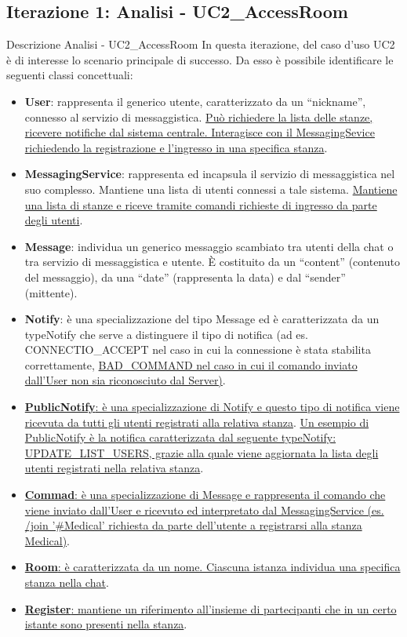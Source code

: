 \documentclass[t]{beamer} %
\let\olditem=\item%
\renewcommand{\item}{\olditem \justifying}%
\begin{document}
\subsection{Iterazione 1: Analisi - UC2\_AccessRoom}
\begin{frame} [allowframebreaks] {Descrizione Analisi - UC2\_AccessRoom}
  In questa iterazione, del caso d’uso UC2 è di interesse lo scenario principale di successo.  Da esso è possibile identificare le seguenti classi concettuali: 
  \begin{itemize}
    \item \textbf{User}: rappresenta il generico utente, caratterizzato da un ``nickname'', connesso al servizio di messaggistica. \underline{Può richiedere la lista 
     delle stanze, ricevere notifiche dal sistema centrale. Interagisce con il MessagingSevice richiedendo la registrazione e l'ingresso in una specifica stanza}.
    \item \textbf{MessagingService}: rappresenta ed incapsula il servizio di messaggistica nel suo complesso. Mantiene una lista di utenti connessi a tale sistema. 
          \underline{Mantiene una lista di stanze e riceve tramite comandi richieste di ingresso da parte degli utenti}.
    \item \textbf{Message}: individua un generico messaggio scambiato tra utenti della chat o tra servizio di messaggistica e utente. È costituito da un ``content'' 
          (contenuto del messaggio), da una ``date'' (rappresenta la data) e dal ``sender'' (mittente).
    \item \textbf{Notify}: è una specializzazione del tipo Message ed è caratterizzata da un typeNotify che serve a distinguere il tipo di notifica (ad es. 
          CONNECTIO\_ACCEPT nel caso in cui la connessione è stata stabilita correttamente, \underline{BAD\_COMMAND nel caso in cui il comando inviato dall'User non 
          sia riconosciuto dal Server)}.
    \item \underline{\textbf{PublicNotify}: è una specializzazione di Notify e questo tipo di notifica viene ricevuta da tutti gli utenti registrati alla relativa 
          stanza}. \underline{Un esempio di PublicNotify è la notifica caratterizzata dal seguente typeNotify: UPDATE\_LIST\_USERS, grazie alla quale viene 
          aggiornata la lista degli utenti registrati nella relativa stanza}.
   \item \underline{\textbf{Commad}: è una specializzazione di Message e rappresenta il comando che viene inviato dall'User e ricevuto ed interpretato dal            
          MessagingService (es. /join '\#Medical' richiesta da parte dell'utente a registrarsi alla stanza Medical)}.        
    \item \underline{\textbf{Room}: è caratterizzata da un nome. Ciascuna istanza individua una specifica stanza nella chat}.
    \item \underline{\textbf{Register}: mantiene un riferimento all’insieme di partecipanti che in un certo istante sono presenti nella stanza}.

   \end{itemize}
\end{frame}
\end{document}
